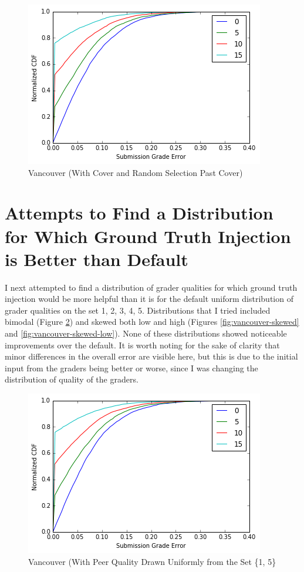 \documentclass{article}
\begin{document}
	\begin{figure}[h]
		\includegraphics{vancouver-cover-random.png}
		\caption{Vancouver (With Cover and Random Selection Past Cover)}
		\label{fig:vancouver-cover-random}
	\end{figure}
	
	
	\section{Attempts to Find a Distribution for Which Ground Truth Injection is Better than Default}
	I next attempted to find a distribution of grader qualities for which ground truth injection would be more helpful than it is for the default uniform distribution of grader qualities on the set {1, 2, 3, 4, 5}. Distributions that I tried included bimodal (Figure \ref{fig:vancouver-bimodal}) and skewed both low and high (Figures \ref{fig:vancouver-skewed} and \ref{fig:vancouver-skewed-low}). None of these distributions showed noticeable improvements over the default. It is worth noting for the sake of clarity that minor differences in the overall error are visible here, but this is due to the initial input from the graders being better or worse, since I was changing the distribution of quality of the graders.
	
	\begin{figure}[h]
		\includegraphics{vancouver-bimodal.png}
		\caption{Vancouver (With Peer Quality Drawn Uniformly from the Set \{1, 5\}}
		\label{fig:vancouver-bimodal}
	\end{figure}
	
\end{document}
